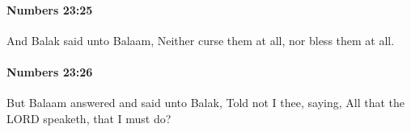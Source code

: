 		\paragraph{Numbers 23:25} %
			\label{NUMBERS-23-25}

			And Balak said unto Balaam, Neither curse them at all, nor bless them at all.


		\paragraph{Numbers 23:26} %
			\label{NUMBERS-23-26}

			But Balaam answered and said unto Balak, Told not I thee, saying, All that the LORD speaketh, that I must do?


